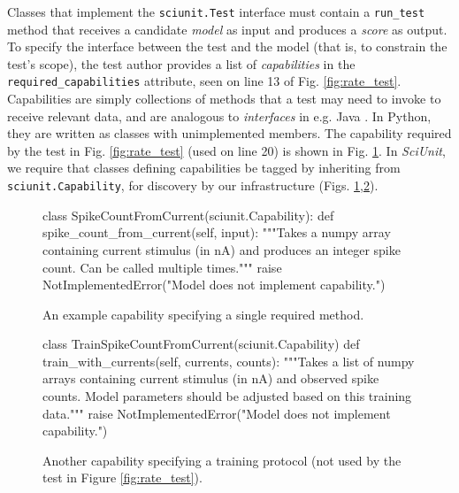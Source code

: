 \documentclass[11pt,letterpaper]{article}
\let\verbx\lstinline
\begin{document}
Classes that implement the \verbx{sciunit.Test} interface must contain a \verbx{run_test} method that receives a candidate \emph{model} as input and produces a \textit{score} as output. To specify the interface between the test and the model (that is, to constrain the test's scope), the test author provides a list of \emph{capabilities} in the \verbx{required_capabilities} attribute, seen on line 13 of Fig. \ref{fig:rate_test}. Capabilities are simply collections of methods that a test may need to invoke to receive relevant data, and are analogous to \emph{interfaces} in e.g. Java \cite{java_interfaces_url}. In Python, they are written as classes with unimplemented members. The capability required by the test in Fig. \ref{fig:rate_test} (used on line 20) is shown in Fig. \ref{fig:capability}. In \textit{SciUnit}, we require that classes defining capabilities be tagged by inheriting from \verbx{sciunit.Capability}, for discovery by our infrastructure (Figs. \ref{fig:capability},\ref{fig:training}). 

\begin{figure}
\begin{python}
class SpikeCountFromCurrent(sciunit.Capability):
  def spike_count_from_current(self, input): 
    """Takes a numpy array containing current stimulus (in nA) and
    produces an integer spike count. Can be called multiple times."""
    raise NotImplementedError("Model does not implement capability.")
\end{python}
\caption{An example capability specifying a single required method.}
\label{fig:capability}
\vspace{-10px}
\end{figure}

\begin{figure}
\begin{python}
class TrainSpikeCountFromCurrent(sciunit.Capability)
  def train_with_currents(self, currents, counts):
    """Takes a list of numpy arrays containing current stimulus (in nA) and
    observed spike counts. Model parameters should be adjusted based on this
    training data."""
    raise NotImplementedError("Model does not implement capability.")
\end{python}
\caption{Another capability specifying a training protocol (not used by the test in Figure \ref{fig:rate_test}).}
\label{fig:training}
\vspace{-15px}
\end{figure}
\end{document}
